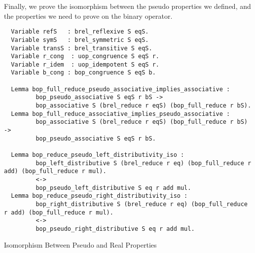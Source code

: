 Finally, we prove the isomorphism between the pseudo properties we defined, and the properties we need to prove on the binary operator.
\begin{listing}[H]
\begin{verbatim}
  Variable refS   : brel_reflexive S eqS. 
  Variable symS   : brel_symmetric S eqS. 
  Variable transS : brel_transitive S eqS.
  Variable r_cong  : uop_congruence S eqS r. 
  Variable r_idem  : uop_idempotent S eqS r.
  Variable b_cong : bop_congruence S eqS b.                                                                                                                                                    
  
  Lemma bop_full_reduce_pseudo_associative_implies_associative : 
         bop_pseudo_associative S eqS r bS -> 
         bop_associative S (brel_reduce r eqS) (bop_full_reduce r bS). 
  Lemma bop_full_reduce_associative_implies_pseudo_associative :
         bop_associative S (brel_reduce r eqS) (bop_full_reduce r bS) ->
         bop_pseudo_associative S eqS r bS. 
         
  Lemma bop_reduce_pseudo_left_distributivity_iso :
         bop_left_distributive S (brel_reduce r eq) (bop_full_reduce r add) (bop_full_reduce r mul).
         <->
         bop_pseudo_left_distributive S eq r add mul.
  Lemma bop_reduce_pseudo_right_distributivity_iso :
         bop_right_distributive S (brel_reduce r eq) (bop_full_reduce r add) (bop_full_reduce r mul).
         <->
         bop_pseudo_right_distributive S eq r add mul.
\end{verbatim}
\caption{Isomorphism Between Pseudo and Real Properties} 
\label{coq:proof:pseudo_iso}
\end{listing}

